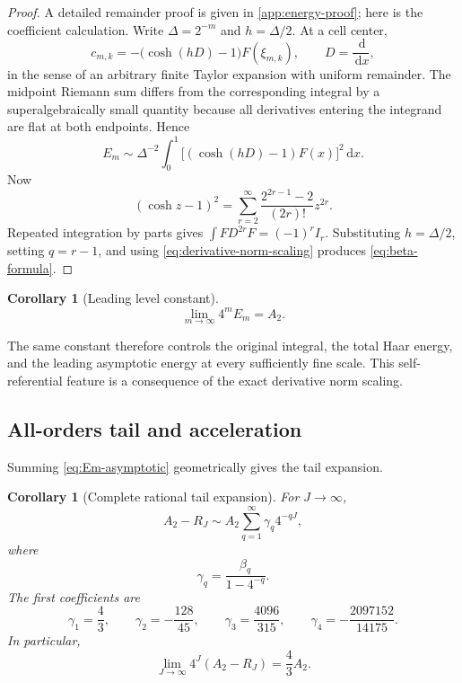 \documentclass[11pt,oneside]{article}
\newtheorem{corollary}[theorem]{Corollary}
\theoremstyle{definition}
\theoremstyle{remark}
\newcommand{\dd}{\,\mathrm d}
\newcommand{\1}{\mathbf 1}
\begin{document}
\begin{proof}
A detailed remainder proof is given in \cref{app:energy-proof}; here is the
coefficient calculation.  Write $\Delta=2^{-m}$ and $h=\Delta/2$.  At a cell
center,
\[
 c_{m,k}=-\bigl(\cosh(hD)-1\bigr)F(\xi_{m,k}),
 \qquad D=\frac{\dd}{\dd x},
\]
in the sense of an arbitrary finite Taylor expansion with uniform remainder.
The midpoint Riemann sum differs from the corresponding integral by a
superalgebraically small quantity because all derivatives entering the
integrand are flat at both endpoints.  Hence
\[
 E_m\sim\Delta^{-2}\int_0^1
 \bigl[(\cosh(hD)-1)F(x)\bigr]^2\dd x.
\]
Now
\begin{equation}
 (\cosh z-1)^2
 =\sum_{r=2}^\infty
   \frac{2^{2r-1}-2}{(2r)!}z^{2r}.                       \label{eq:cosh-square}
\end{equation}
Repeated integration by parts gives
$\int F D^{2r}F=(-1)^rI_r$.  Substituting
$h=\Delta/2$, setting $q=r-1$, and using
\eqref{eq:derivative-norm-scaling} produces
\eqref{eq:beta-formula}.
\end{proof}

\begin{corollary}[Leading level constant]
\label{cor:Em-leading}
\begin{equation}
 \boxed{\displaystyle
 \lim_{m\to\infty}4^mE_m=A_2.}                           \label{eq:Em-leading}
\end{equation}
\end{corollary}

The same constant therefore controls the original integral, the total Haar
energy, and the leading asymptotic energy at every sufficiently fine scale.
This self-referential feature is a consequence of the exact derivative norm
scaling.

\subsection{All-orders tail and acceleration}

Summing \eqref{eq:Em-asymptotic} geometrically gives the tail expansion.

\begin{corollary}[Complete rational tail expansion]
\label{cor:A2-tail-asymptotic}
For $J\to\infty$,
\begin{equation}
 A_2-R_J\sim A_2\sum_{q=1}^\infty\gamma_q4^{-qJ},        \label{eq:A2-tail-asymptotic}
\end{equation}
where
\begin{equation}
 \gamma_q=\frac{\beta_q}{1-4^{-q}}.                     \label{eq:gamma-definition}
\end{equation}
The first coefficients are
\begin{equation}
 \gamma_1=\frac43,
 \qquad
 \gamma_2=-\frac{128}{45},
 \qquad
 \gamma_3=\frac{4096}{315},
 \qquad
 \gamma_4=-\frac{2097152}{14175}.                       \label{eq:gamma-first}
\end{equation}
In particular,
\begin{equation}
 \boxed{\displaystyle
 \lim_{J\to\infty}4^J(A_2-R_J)=\frac43A_2.}             \label{eq:A2-tail-leading}
\end{equation}
\end{corollary}
\end{document}

